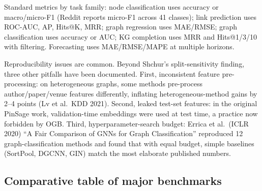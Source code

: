 Standard metrics by task family: node classification uses accuracy or macro/micro-F1 (Reddit reports micro-F1 across 41 classes); link prediction uses ROC-AUC, AP, Hits@K, MRR; graph regression uses MAE/RMSE; graph classification uses accuracy or AUC; KG completion uses MRR and Hits@1/3/10 with filtering. Forecasting uses MAE/RMSE/MAPE at multiple horizons.

Reproducibility issues are common. Beyond Shchur's split-sensitivity finding, three other pitfalls have been documented. First, inconsistent feature pre-processing: on heterogeneous graphs, some methods pre-process author/paper/venue features differently, inflating heterogeneous-method gains by 2--4 points (Lv et al.~KDD 2021). Second, leaked test-set features: in the original PinSage work, validation-time embeddings were used at test time, a practice now forbidden by OGB. Third, hyperparameter-search budget: Errica et al.~(ICLR 2020) ``A Fair Comparison of GNNs for Graph Classification'' reproduced 12 graph-classification methods and found that with equal budget, simple baselines (SortPool, DGCNN, GIN) match the most elaborate published numbers.

\subsection{Comparative table of major benchmarks}\label{comparative-table-of-major-benchmarks}

